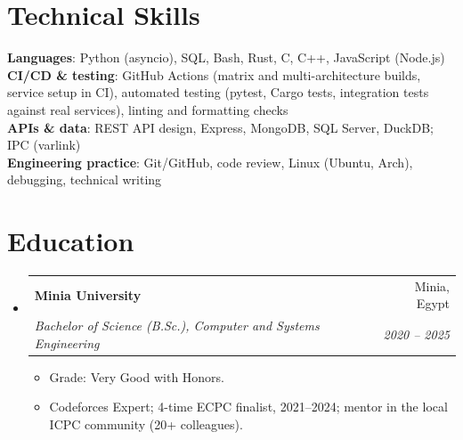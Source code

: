 \documentclass[letterpaper,11pt]{article}
\makeatletter
\newcommand{\resumeItem}[1]{
  \item\small{
    {#1 \vspace{-2pt}}
  }
}
\newcommand{\resumeSubheading}[4]{
  \vspace{-2pt}\item
    \begin{tabular*}{0.97\textwidth}[t]{l@{\extracolsep{\fill}}r}
      \textbf{#1} & #2 \\
      \textit{\small#3} & \textit{\small #4} \\
    \end{tabular*}\vspace{-7pt}
}
\newcommand{\resumeSubHeadingListStart}{\begin{itemize}[leftmargin=0.15in, label={}]}
\newcommand{\resumeSubHeadingListEnd}{\end{itemize}}
\newcommand{\resumeItemListStart}{\begin{itemize}}
\newcommand{\resumeItemListEnd}{\end{itemize}\vspace{-5pt}}
\makeatother
\begin{document}
%
\section{Technical Skills}
 \begin{itemize}[leftmargin=0.15in, label={}]
    \small{\item{
     \textbf{Languages}{: Python (asyncio), SQL, Bash, Rust, C, C++, JavaScript (Node.js)} \\
     \textbf{CI/CD \& testing}{: GitHub Actions (matrix and multi-architecture builds, service setup in CI), automated testing (pytest, Cargo tests, integration tests against real services), linting and formatting checks} \\
     \textbf{APIs \& data}{: REST API design, Express, MongoDB, SQL Server, DuckDB; IPC (varlink)} \\
     \textbf{Engineering practice}{: Git/GitHub, code review, Linux (Ubuntu, Arch), debugging, technical writing}
    }}
 \end{itemize}

\section{Education}
  \resumeSubHeadingListStart
    \resumeSubheading
      {Minia University}{Minia, Egypt}
      {Bachelor of Science (B.Sc.), Computer and Systems Engineering}{2020 -- 2025}
      \resumeItemListStart
        \resumeItem{Grade: Very Good with Honors.}
        \resumeItem{Codeforces Expert; 4-time ECPC finalist, 2021--2024; mentor in the local ICPC community (20+ colleagues).}
      \resumeItemListEnd
  \resumeSubHeadingListEnd


\end{document}
